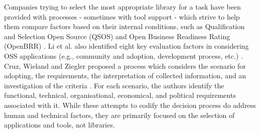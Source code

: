 Companies trying to select the most appropriate library for a task have been provided with processes - sometimes with tool support - which strive to help them compare factors based on their internal conditions, such as Qualification and Selection Open Source (QSOS) and Open Business Readiness Rating (OpenBRR) \cite{deprez2008comparing, semeteys2008method, wasserman2017osspal}. Li et al. also identified eight key evaluation factors in considering OSS applications (e.g., community and adoption, development process, etc.) \cite{li2022exploring}.  Cruz, Wieland and Ziegler proposed a process which considers the scenario for adopting, the requirements, the interpretation of collected information, and an investigation of the criteria \cite{cruz2006evaluation}. For each scenario, the authors identify the functional, technical, organisational, economical, and political requirements associated with it. While these attempts to codify the decision process do address human and technical factors, they are primarily focused on the selection of applications and tools, not libraries.
